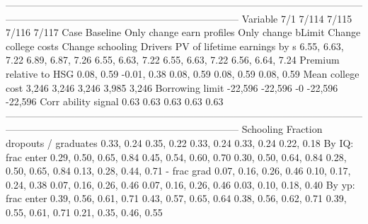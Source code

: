 -----------------------------------------------------------------------------------------------------------------------------------------------------------------------------------
                              Variable                          7/1                        7/114                    7/115                        7/116                        7/117
                                  Case                     Baseline    Only change earn profiles       Only change bLimit         Change college costs             Change schooling
                               Drivers                                                                                                                                             
          PV of lifetime earnings by s             6.55, 6.63, 7.22             6.89, 6.87, 7.26         6.55, 6.63, 7.22             6.55, 6.63, 7.22             6.56, 6.64, 7.24
               Premium relative to HSG                   0.08, 0.59                  -0.01, 0.38               0.08, 0.59                   0.08, 0.59                   0.08, 0.59
                     Mean college cost                        3,246                        3,246                    3,246                        3,985                        3,246
                       Borrowing limit                      -22,596                      -22,596                       -0                      -22,596                      -22,596
                   Corr ability signal                         0.63                         0.63                     0.63                         0.63                         0.63
-----------------------------------------------------------------------------------------------------------------------------------------------------------------------------------
                             Schooling                                                                                                                                             
         Fraction dropouts / graduates                   0.33, 0.24                   0.35, 0.22               0.33, 0.24                   0.33, 0.24                   0.22, 0.18
                     By IQ: frac enter       0.29, 0.50, 0.65, 0.84       0.45, 0.54, 0.60, 0.70   0.30, 0.50, 0.64, 0.84       0.28, 0.50, 0.65, 0.84       0.13, 0.28, 0.44, 0.71
                           - frac grad       0.07, 0.16, 0.26, 0.46       0.10, 0.17, 0.24, 0.38   0.07, 0.16, 0.26, 0.46       0.07, 0.16, 0.26, 0.46       0.03, 0.10, 0.18, 0.40
                     By yp: frac enter       0.39, 0.56, 0.61, 0.71       0.43, 0.57, 0.65, 0.64   0.38, 0.56, 0.62, 0.71       0.39, 0.55, 0.61, 0.71       0.21, 0.35, 0.46, 0.55
